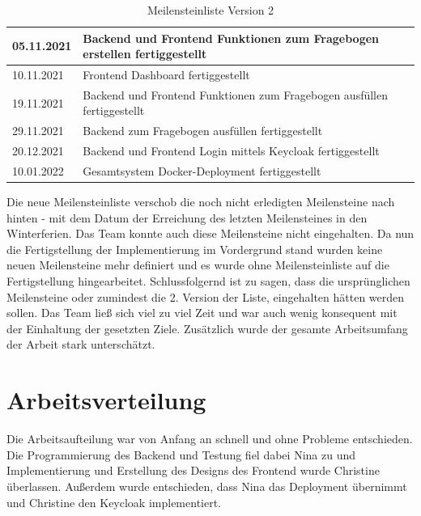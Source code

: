 \begin{table}[H]
    \centering
    \caption{Meilensteinliste Version 2}
    \label{tab:meilensteine2}
    \begin{tabular}{|l|l|}
        \hline
        05.11.2021 & Backend und Frontend Funktionen zum Fragebogen erstellen fertiggestellt \\ \hline
        10.11.2021 & Frontend Dashboard fertiggestellt \\ \hline
        19.11.2021 & Backend und Frontend Funktionen zum Fragebogen ausfüllen fertiggestellt \\ \hline
        29.11.2021 & Backend zum Fragebogen ausfüllen fertiggestellt \\ \hline
        20.12.2021 & Backend und Frontend Login mittels Keycloak fertiggestellt \\ \hline
        10.01.2022 & Gesamtsystem Docker-Deployment fertiggestellt \\ \hline
    \end{tabular}
\end{table}

Die neue Meilensteinliste verschob die noch nicht erledigten Meilensteine nach hinten - mit dem Datum der 
Erreichung des letzten Meilensteines in den Winterferien. Das Team konnte auch  
diese Meilensteine nicht eingehalten. Da nun die Fertigstellung der Implementierung im Vordergrund 
stand wurden keine neuen Meilensteine mehr definiert und es wurde ohne Meilensteinliste auf die Fertigstellung hingearbeitet.
\newline
\newline
Schlussfolgernd ist zu sagen, dass die ursprünglichen Meilensteine oder zumindest die 2. Version der Liste, eingehalten hätten werden sollen.
Das Team ließ sich viel zu viel Zeit und war auch wenig konsequent mit der Einhaltung der gesetzten Ziele.
Zusätzlich wurde der gesamte Arbeitsumfang der Arbeit stark unterschätzt.

\chapter{Arbeitsverteilung}
Die Arbeitsaufteilung war von Anfang an schnell und ohne Probleme entschieden. 
Die Programmierung des Backend und Testung fiel dabei Nina zu und Implementierung und Erstellung des Designs 
des Frontend wurde Christine überlassen. Außerdem wurde entschieden, dass Nina das Deployment übernimmt und 
Christine den Keycloak implementiert.

